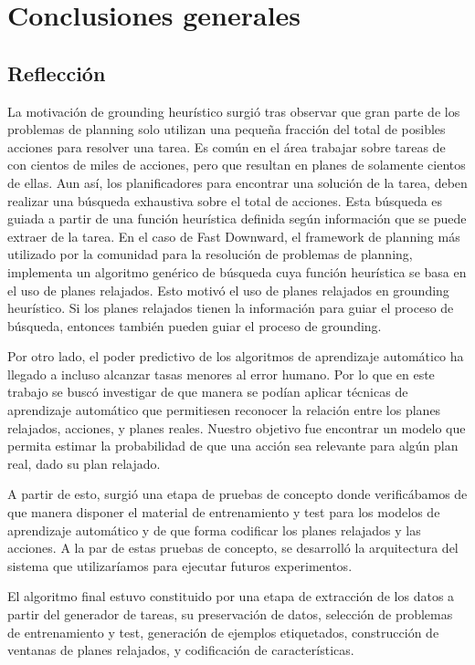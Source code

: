 \chapter{Conclusiones generales}
\label{ch:con}

\section{Reflección}

La motivación de grounding heurístico surgió tras observar que gran parte de los
problemas de planning solo utilizan una pequeña fracción del total de posibles
acciones para resolver una tarea. Es común en el área trabajar sobre tareas de
con cientos de miles de acciones, pero que resultan en planes de solamente
cientos de ellas. Aun así, los planificadores para encontrar una solución de la
tarea, deben realizar una búsqueda exhaustiva sobre el total de acciones. Esta
búsqueda es guiada a partir de una función heurística definida según
información que se puede extraer de la tarea. En el caso de Fast Downward, el
framework de planning más utilizado por la comunidad para la resolución de
problemas de planning, implementa un algoritmo genérico de búsqueda cuya función
heurística se basa en el uso de planes relajados. Esto motivó el uso de planes
relajados en grounding heurístico. Si los planes relajados tienen la información
para guiar el proceso de búsqueda, entonces también pueden guiar el proceso de
grounding.

Por otro lado, el poder predictivo de los algoritmos de aprendizaje automático
ha llegado a incluso alcanzar tasas menores al error humano. Por lo que en este
trabajo se buscó investigar de que manera se podían aplicar técnicas de
aprendizaje automático que permitiesen reconocer la relación entre los planes
relajados, acciones, y planes reales. Nuestro objetivo fue encontrar un modelo
que permita estimar la probabilidad de que una acción sea relevante para algún
plan real, dado su plan relajado.

A partir de esto, surgió una etapa de pruebas de concepto donde verificábamos de
que manera disponer el material de entrenamiento y test para los modelos de
aprendizaje automático y de que forma codificar los planes relajados y las
acciones. A la par de estas pruebas de concepto, se desarrolló la arquitectura
del sistema que utilizaríamos para ejecutar futuros experimentos.

El algoritmo final estuvo constituido por una etapa de extracción de los datos a
partir del generador de tareas, su preservación de datos, selección de problemas
de entrenamiento y test, generación de ejemplos etiquetados, construcción de
ventanas de planes relajados, y codificación de características.


